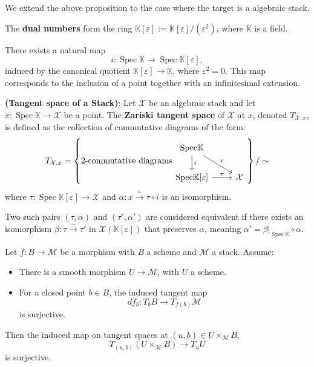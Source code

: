 \documentclass{amsart}
\begin{document}
We extend the above proposition to the case where the target is a algebraic stack.
\begin{remark}
   \textnormal{The \textbf{dual numbers} form the ring $\mathbb{K}[\varepsilon] := \mathbb{K}[\varepsilon]/(\varepsilon^2)$, where $\mathbb{K}$ is a field.} 
\end{remark}
There exists a natural map
\[
i : \operatorname{Spec} \mathbb{K} \longrightarrow \operatorname{Spec} \mathbb{K}[\varepsilon],
\]
induced by the canonical quotient \( \mathbb{K}[\varepsilon] \longrightarrow \mathbb{K} \), where \( \varepsilon^2 = 0 \). This map corresponds to the inclusion of a point together with an infinitesimal extension.

\begin{definition} \label{def:tss}
\textnormal{\textbf{(Tangent space of a Stack)}: Let $\mathcal{X}$ be an algebraic stack and let $x: \operatorname{Spec} \mathbb{K} \to \mathcal{X}$ be a point. The \textbf{Zariski tangent space} of $\mathcal{X}$ at $x$, denoted $T_{\mathcal{X},x}$, is defined as the collection of commutative diagrams of the form:}
\[T_{\mathcal{X},x} = \left\{ \textnormal{2-commutative diagrams}
\begin{tikzcd}
\textnormal{Spec} \mathbb{K} \arrow[d, "i"] \arrow[dr, "x"]  \\
 \textnormal{Spec}\mathbb{K}[\varepsilon] \arrow[r, "\tau"]& \mathcal{X}
\end{tikzcd}\right\} / \mathrel{\sim}
\]
\textnormal{where $\tau: \operatorname{Spec} \mathbb{K}[\varepsilon] \to \mathcal{X}$ and $\alpha: x \xrightarrow{\sim} \tau \circ i$ is an isomorphism.} 

\textnormal{Two such pairs $(\tau, \alpha)$ and $(\tau', \alpha')$ are considered equivalent if there exists an isomorphism $\beta: \tau \xrightarrow{\sim} \tau'$ in $\mathcal{X}(\mathbb{K}[\varepsilon])$ that preserves $\alpha$, meaning $\alpha' = \beta|_{\operatorname{Spec} \mathbb{K}} \circ \alpha$.}
\end{definition}

\begin{proposition}\label{prop:surjectivity_tangent}
Let \( f: B \to \mathcal{M} \) be a morphism with \( B \) a scheme and \(\mathcal{M}\) a stack. Assume:
\begin{itemize}
    \item There is a smooth morphism \( U \to \mathcal{M} \), with \( U \) a scheme.
    \item For a closed point \( b \in B \), the induced tangent map
    \[
    df_b: T_b B \to T_{f(b)} \mathcal{M}
    \]
    is surjective.
\end{itemize}
Then the induced map on tangent spaces at \((u,b) \in U \times_{\mathcal{M}} B\),
\[
T_{(u,b)}(U \times_{\mathcal{M}} B) \to T_u U
\]
is surjective.
\end{proposition}
\end{document}
